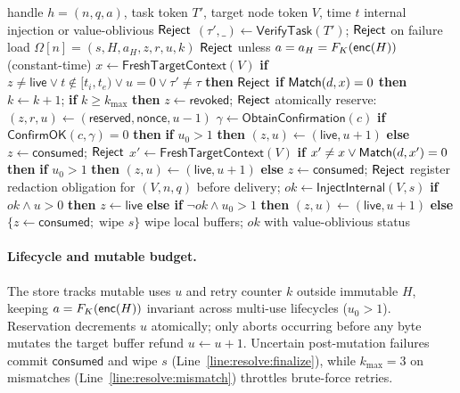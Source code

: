 \begin{algorithm}[t]
\caption{\SH{} \Enter/Resolve}
\label{alg:resolve}
\begin{algorithmic}[1]
\Require handle $h=(n,q,a)$, task token $T'$, target node token $V$, time $t$
\Ensure internal injection or value-oblivious $\mathsf{Reject}$
\State $(\tau',\_)\gets\mathsf{VerifyTask}(T')$; \Return $\mathsf{Reject}$ on failure
\State load $\Omega[n]=(s,H,a_H,z,r,u,k)$
\State \Return $\mathsf{Reject}$ unless $a=a_H=F_K(\mathsf{enc}(H))$ (constant-time)
\State $x\gets\mathsf{FreshTargetContext}(V)$
\State \label{line:resolve:guard}\textbf{if} $z\ne\mathsf{live} \lor t\notin[t_i,t_e) \lor u=0 \lor \tau'\ne\tau$ \textbf{then} \Return $\mathsf{Reject}$
\State \label{line:resolve:mismatch}\textbf{if} $\mathsf{Match}(d,x)=0$ \textbf{then} $k\gets k+1$; \textbf{if} $k\ge k_{\max}$ \textbf{then} $z\gets\mathsf{revoked}$; \Return $\mathsf{Reject}$
\State \label{line:resolve:reserve}atomically reserve: $(z,r,u)\gets(\mathsf{reserved},\mathsf{nonce},u-1)$
\State $\gamma\gets\mathsf{ObtainConfirmation}(c)$
\State \label{line:resolve:confirm}\textbf{if} $\mathsf{ConfirmOK}(c,\gamma)=0$ \textbf{then} \textbf{if} $u_0 > 1$ \textbf{then} $(z, u) \gets (\mathsf{live}, u + 1)$ \textbf{else} $z \gets \mathsf{consumed}$; \Return $\mathsf{Reject}$
\State $x'\gets\mathsf{FreshTargetContext}(V)$
\State \label{line:resolve:revalidate}\textbf{if} $x'\ne x \lor \mathsf{Match}(d,x')=0$ \textbf{then} \textbf{if} $u_0 > 1$ \textbf{then} $(z, u) \gets (\mathsf{live}, u + 1)$ \textbf{else} $z \gets \mathsf{consumed}$; \Return $\mathsf{Reject}$
\State register redaction obligation for $(V,n,q)$ before delivery; $ok\gets\mathsf{InjectInternal}(V,s)$
\State \label{line:resolve:finalize}\textbf{if} $ok \land u>0$ \textbf{then} $z\gets\mathsf{live}$ \textbf{else if} $\neg ok \land u_0>1$ \textbf{then} $(z,u)\gets(\mathsf{live},u+1)$ \textbf{else} $\{z\gets\mathsf{consumed};\; \text{wipe } s\}$
\State wipe local buffers; \Return $ok$ with value-oblivious status
\end{algorithmic}
\end{algorithm}

\paragraph{Lifecycle and mutable budget.} The store tracks mutable uses $u$ and retry counter $k$ outside immutable $H$, keeping $a = F_K(\mathsf{enc}(H))$ invariant across multi-use lifecycles ($u_0 > 1$). Reservation decrements $u$ atomically; only aborts occurring before any byte mutates the target buffer refund $u \gets u + 1$. Uncertain post-mutation failures commit $\mathsf{consumed}$ and wipe $s$ (Line~\ref{line:resolve:finalize}), while $k_{\max}=3$ on mismatches (Line~\ref{line:resolve:mismatch}) throttles brute-force retries.

